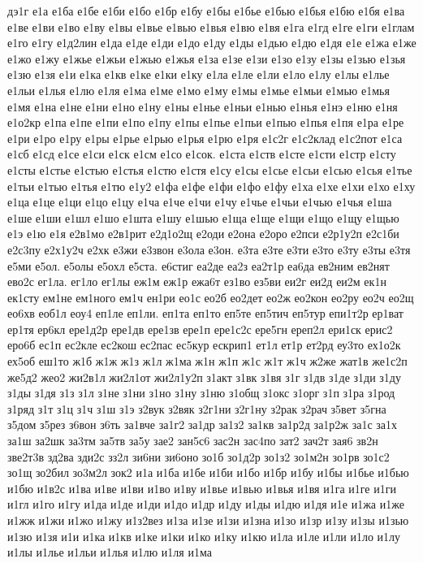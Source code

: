 {дэ1г
е1а
е1ба
е1бе
е1би
е1бо
е1бр
е1бу
е1бы
е1бье
е1бью
е1бья
е1бю
е1бя
е1ва
е1ве
е1ви
е1во
е1ву
е1вы
е1вье
е1вью
е1вья
е1вю
е1вя
е1га
е1гд
е1ге
е1ги
е1глам
е1го
е1гу
е1д2лин
е1да
е1де
е1ди
е1до
е1ду
е1ды
е1дью
е1дю
е1дя
е1е
е1жа
е1же
е1жо
е1жу
е1жье
е1жьи
е1жью
е1жья
е1за
е1зе
е1зи
е1зо
е1зу
е1зы
е1зью
е1зья
е1зю
е1зя
е1и
е1ка
е1кв
е1ке
е1ки
е1ку
е1ла
е1ле
е1ли
е1ло
е1лу
е1лы
е1лье
е1льи
е1лья
е1лю
е1ля
е1ма
е1ме
е1мо
е1му
е1мы
е1мье
е1мьи
е1мью
е1мья
е1мя
е1на
е1не
е1ни
е1но
е1ну
е1ны
е1нье
е1ньи
е1нью
е1нья
е1нэ
е1ню
е1ня
е1о2кр
е1па
е1пе
е1пи
е1по
е1пу
е1пы
е1пье
е1пьи
е1пью
е1пья
е1пя
е1ра
е1ре
е1ри
е1ро
е1ру
е1ры
е1рье
е1рью
е1рья
е1рю
е1ря
е1с2г
е1с2клад
е1с2пот
е1са
е1сб
е1сд
е1се
е1си
е1ск
е1см
е1со
е1сок.
е1ста
е1ств
е1сте
е1сти
е1стр
е1сту
е1сты
е1стье
е1стью
е1стья
е1стю
е1стя
е1су
е1сы
е1сье
е1сьи
е1сью
е1сья
е1тье
е1тьи
е1тью
е1тья
е1тю
е1у2
е1фа
е1фе
е1фи
е1фо
е1фу
е1ха
е1хе
е1хи
е1хо
е1ху
е1ца
е1це
е1ци
е1цо
е1цу
е1ча
е1че
е1чи
е1чу
е1чье
е1чьи
е1чью
е1чья
е1ша
е1ше
е1ши
е1шл
е1шо
е1шта
е1шу
е1шью
е1ща
е1ще
е1щи
е1що
е1щу
е1щью
е1э
е1ю
е1я
е2в1мо
е2в1рит
е2д1о2щ
е2оди
е2она
е2оро
е2пси
е2р1у2п
е2с1би
е2с3пу
е2х1у2ч
е2хк
е3жи
е3звон
е3ола
е3он.
е3та
е3те
е3ти
е3то
е3ту
е3ты
е3тя
е5ми
е5ол.
е5олы
е5охл
е5ста.
е6стиг
еа2де
еа2з
еа2т1р
еа6да
ев2ним
ев2нят
ево2с
ег1ла.
ег1ло
ег1лы
еж1м
еж1р
ежа6т
ез1во
ез5ви
еи2г
еи2д
еи2м
ек1н
ек1сту
ем1не
ем1ного
ем1ч
ен1ри
ео1с
ео2б
ео2дет
ео2ж
ео2кон
ео2ру
ео2ч
ео2щ
ео6хв
еоб1л
еоу4
еп1ле
еп1ли.
еп1та
еп1то
еп5те
еп5тич
еп5тур
епи1т2р
ер1ват
ер1тя
ер6кл
ере1д2р
ере1дв
ере1зв
ере1п
ере1с2с
ере5гн
ереп2л
ери1ск
ерис2
еро6б
ес1п
ес2кле
ес2кош
ес2пас
ес5кур
ескрип1
ет1л
ет1р
ет2рд
еу3то
ех1о2к
ех5об
еш1то
ж1б
ж1ж
ж1з
ж1л
ж1ма
ж1н
ж1п
ж1с
ж1т
ж1ч
ж2же
жат1в
же1с2п
же5д2
жео2
жи2в1л
жи2л1от
жи2л1у2п
з1акт
з1вк
з1вя
з1г
з1дв
з1де
з1ди
з1ду
з1ды
з1дя
з1з
з1л
з1не
з1ни
з1но
з1ну
з1ню
з1общ
з1окс
з1орг
з1п
з1ра
з1род
з1ряд
з1т
з1ц
з1ч
з1ш
з1э
з2вук
з2вяк
з2г1ни
з2г1ну
з2рак
з2рач
з5вет
з5гна
з5дом
з5рез
з6вон
з6ть
за1вче
за1г2
за1др
за1з2
за1кв
за1р2д
за1р2ж
за1с
за1х
за1ш
за2шк
за3тм
за5тв
за5у
зае2
зан5с6
зас2н
зас4по
зат2
зач2т
зая6
зв2н
зве2т3в
зд2ва
зди2с
зз2л
зи6ни
зи6оно
зо1б
зо1д2р
зо1з2
зо1м2н
зо1рв
зо1с2
зо1щ
зо2бил
зо3м2л
зок2
и1а
и1ба
и1бе
и1би
и1бо
и1бр
и1бу
и1бы
и1бье
и1бью
и1бю
и1в2с
и1ва
и1ве
и1ви
и1во
и1ву
и1вье
и1вью
и1вья
и1вя
и1га
и1ге
и1ги
и1гл
и1го
и1гу
и1да
и1де
и1ди
и1до
и1др
и1ду
и1ды
и1дю
и1дя
и1е
и1жа
и1же
и1жж
и1жи
и1жо
и1жу
и1з2вез
и1за
и1зе
и1зи
и1зна
и1зо
и1зр
и1зу
и1зы
и1зью
и1зю
и1зя
и1и
и1ка
и1кв
и1ке
и1ки
и1ко
и1ку
и1кю
и1ла
и1ле
и1ли
и1ло
и1лу
и1лы
и1лье
и1льи
и1лья
и1лю
и1ля
и1ма
}
